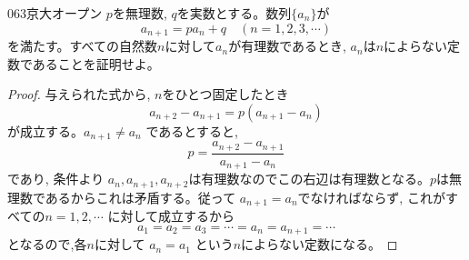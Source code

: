 \begin{thm}{063}{}{京大オープン}
 $p$を無理数, $q$を実数とする。数列$\{a_n\}$が
\[a_{n+1}=pa_n+q \quad (n=1,2,3,\cdots)\]
を満たす。すべての自然数$n$に対して$a_n$が有理数であるとき, $a_n$は$n$によらない定数であることを証明せよ。
\end{thm}

\begin{proof}
与えられた式から, $n$をひとつ固定したとき
\[ a_{n+2}-a_{n+1}=p(a_{n+1}-a_n) \]
が成立する。$a_{n+1}\neq a_n$ であるとすると, 
\[p=\dfrac{a_{n+2}-a_{n+1}}{a_{n+1}-a_{n}}\]
であり, 条件より $a_n, a_{n+1}, a_{n+2}$は有理数なのでこの右辺は有理数となる。$p$は無理数であるからこれは矛盾する。従って $a_{n+1}=a_n$でなければならず, これがすべての$n=1,2,\cdots$ に対して成立するから
\[a_1=a_2=a_3=\cdots =a_n=a_{n+1}=\cdots \]
となるので,各$n$に対して $a_n=a_1$ という$n$によらない定数になる。
\end{proof}
